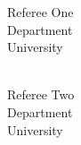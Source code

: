 \documentclass[
  date,
  number,
]{wgu-cv}
\begin{document}
\begin{multicols}{2}

\begin{minipage}{\linewidth}
  Referee One \\
  Department \\
  University \\
   \\
\end{minipage}

\begin{minipage}{\linewidth}
  Referee Two \\
  Department \\
  University \\
   \\
\end{minipage}

\end{multicols}

\nobibliography*
\end{document}
